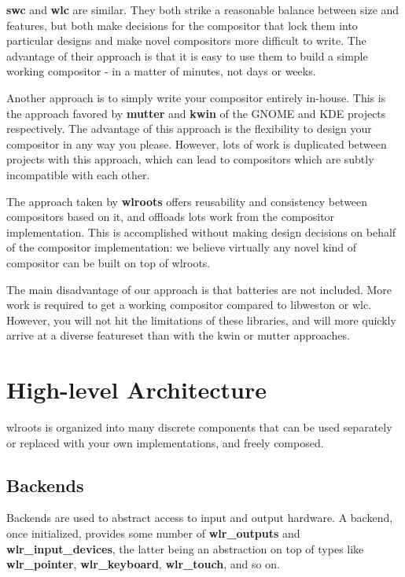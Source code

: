 \documentclass{article}
\begin{document}
\textbf{swc} and \textbf{wlc} are similar. They both strike a reasonable balance
between size and features, but both make decisions for the compositor that lock
them into particular designs and make novel compositors more difficult to
write. The advantage of their approach is that it is easy to use them to build a
simple working compositor - in a matter of minutes, not days or weeks.

Another approach is to simply write your compositor entirely in-house. This is
the approach favored by \textbf{mutter} and \textbf{kwin} of the GNOME and KDE
projects respectively. The advantage of this approach is the flexibility to
design your compositor in any way you please. However, lots of work is
duplicated between projects with this approach, which can lead to compositors
which are subtly incompatible with each other.

The approach taken by \textbf{wlroots} offers reusability and consistency
between compositors based on it, and offloads lots work from the compositor
implementation. This is accomplished without making design decisions on behalf
of the compositor implementation: we believe virtually any novel kind of
compositor can be built on top of wlroots.

The main disadvantage of our approach is that batteries are not included. More
work is required to get a working compositor compared to libweston or wlc.
However, you will not hit the limitations of these libraries, and will more
quickly arrive at a diverse featureset than with the kwin or mutter approaches.

\section{High-level Architecture}\label{highlevel}

wlroots is organized into many discrete components that can be used separately
or replaced with your own implementations, and freely composed.

\subsection{Backends}\label{high level backends}

Backends are used to abstract access to input and output hardware. A backend,
once initialized, provides some number of \textbf{wlr_outputs} and
\textbf{wlr_input_devices}, the latter being an abstraction on top of types
like \textbf{wlr_pointer}, \textbf{wlr_keyboard}, \textbf{wlr_touch}, and so on.
\end{document}
